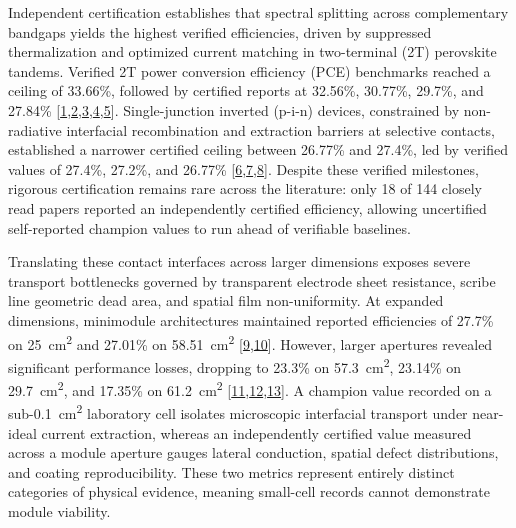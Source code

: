 \documentclass[
  11pt,
]{article}
\begin{document}
Independent certification establishes that spectral splitting across
complementary bandgaps yields the highest verified efficiencies, driven
by suppressed thermalization and optimized current matching in
two-terminal (2T) perovskite tandems. Verified 2T power conversion
efficiency (PCE) benchmarks reached a ceiling of 33.66\%, followed by
certified reports at 32.56\%, 30.77\%, 29.7\%, and 27.84\%
{[}\href{https://doi.org/10.1038/s41467-026-76266-0}{1},\href{https://doi.org/10.1002/anie.5241611}{2},\href{https://doi.org/10.1038/s41467-026-76713-y}{3},\href{https://doi.org/10.1016/j.joule.2026.102645}{4},\href{https://doi.org/10.1038/s41467-026-76786-9}{5}{]}.
Single-junction inverted (p-i-n) devices, constrained by non-radiative
interfacial recombination and extraction barriers at selective contacts,
established a narrower certified ceiling between 26.77\% and 27.4\%, led
by verified values of 27.4\%, 27.2\%, and 26.77\%
{[}\href{https://doi.org/10.1126/science.aeg8415}{6},\href{https://doi.org/10.1038/s41467-026-76497-1}{7},\href{https://doi.org/10.1002/anie.3095986}{8}{]}.
Despite these verified milestones, rigorous certification remains rare
across the literature: only 18 of 144 closely read papers reported an
independently certified efficiency, allowing uncertified self-reported
champion values to run ahead of verifiable baselines.

Translating these contact interfaces across larger dimensions exposes
severe transport bottlenecks governed by transparent electrode sheet
resistance, scribe line geometric dead area, and spatial film
non-uniformity. At expanded dimensions, minimodule architectures
maintained reported efficiencies of 27.7\% on
\qty{25}{\centi\meter\squared} and 27.01\% on
\qty{58.51}{\centi\meter\squared}
{[}\href{https://doi.org/10.1038/s43246-026-01321-8}{9},\href{https://doi.org/10.1002/adma.74469}{10}{]}.
However, larger apertures revealed significant performance losses,
dropping to 23.3\% on \qty{57.3}{\centi\meter\squared}, 23.14\% on
\qty{29.7}{\centi\meter\squared}, and 17.35\% on
\qty{61.2}{\centi\meter\squared}
{[}\href{https://doi.org/10.1002/adma.74629}{11},\href{https://doi.org/10.1002/advs.76950}{12},\href{https://doi.org/10.1002/smll.75068}{13}{]}.
A champion value recorded on a sub-\qty{0.1}{\centi\meter\squared}
laboratory cell isolates microscopic interfacial transport under
near-ideal current extraction, whereas an independently certified value
measured across a module aperture gauges lateral conduction, spatial
defect distributions, and coating reproducibility. These two metrics
represent entirely distinct categories of physical evidence, meaning
small-cell records cannot demonstrate module viability.
\end{document}
